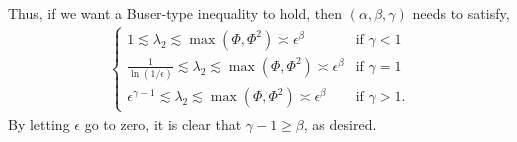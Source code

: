Thus, if we want a Buser-type inequality to hold, then $(\alpha,\beta,\gamma)$ needs to satisfy,
\begin{align*}
\begin{cases}
  1\lesssim \lambda_2 \lesssim \max(\Phi,\Phi^2)  \asymp \epsilon^\beta & \text{if } \gamma<1\\
  \frac{1}{\ln\left(1/\epsilon\right)}\lesssim \lambda_2 \lesssim \max(\Phi,\Phi^2)  \asymp \epsilon^\beta& \text{if } \gamma = 1\\
  \epsilon^{\gamma-1}\lesssim \lambda_2 \lesssim \max(\Phi,\Phi^2)  \asymp \epsilon^\beta& \text{if } \gamma>1.
\end{cases}
\end{align*}
By letting $\epsilon$ go to zero, it is clear that $\gamma-1\geq \beta$,
   as desired.

